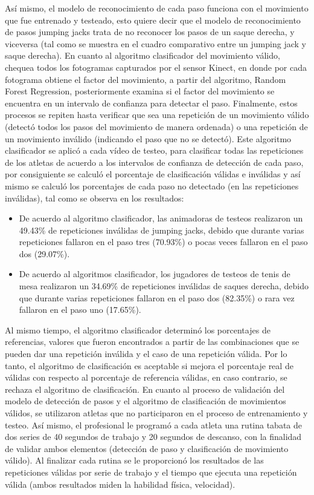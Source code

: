 \medbreak
As\'i mismo, el modelo de reconocimiento de cada paso funciona con el movimiento que fue entrenado y testeado, esto quiere decir que el modelo de reconocimiento de pasos jumping jacks trata de no reconocer los pasos de un saque derecha, y viceversa (tal como se muestra en el cuadro comparativo entre un jumping jack  y saque derecha).
\medbreak
En cuanto al algoritmo clasificador del movimiento v\'alido, chequea todos los fotogramas capturados por el sensor Kinect, en donde por cada fotograma obtiene el factor del movimiento, a partir del algoritmo, Random Forest Regression, posteriormente examina si el factor del movimiento se encuentra en un intervalo de confianza para detectar el paso. Finalmente, estos procesos se repiten hasta verificar que sea una repetici\'on de un movimiento v\'alido (detect\'o todos los pasos del movimiento de manera ordenada) o una repetici\'on de un movimiento inv\'alido (indicando el paso que no se detect\'o).
\medbreak
Este algoritmo clasificador se aplic\'o a cada v\'ideo de testeo, para clasificar todas las repeticiones de los atletas de acuerdo a los intervalos de confianza de detecci\'on de cada paso, por consiguiente se calcul\'o el porcentaje de clasificaci\'on v\'alidas e inv\'alidas y as\'i mismo se calcul\'o los porcentajes de cada paso no detectado (en las repeticiones inv\'alidas), tal como se observa en los resultados:
\begin{itemize}
\item	De acuerdo al algoritmo clasificador, las animadoras de testeos realizaron un 49.43\% de repeticiones inv\'alidas de jumping jacks, debido que durante varias repeticiones fallaron en el paso tres (70.93\%) o pocas veces fallaron en el paso dos (29.07\%).
\item De acuerdo al algoritmos clasificador, los jugadores de testeos de tenis de mesa realizaron un 34.69\% de repeticiones inv\'alidas de saques derecha, debido que durante varias repeticiones fallaron en el paso dos (82.35\%) o rara vez fallaron en el paso uno (17.65\%).
\end{itemize}
Al mismo tiempo, el algoritmo clasificador determin\'o los porcentajes de referencias, valores que fueron encontrados a partir de las combinaciones que se pueden dar una repetici\'on inv\'alida y el caso de una repetici\'on v\'alida. 
\medbreak
Por lo tanto, el algoritmo de clasificaci\'on es aceptable si mejora el porcentaje real de v\'alidas con respecto al porcentaje de referencia v\'alidas, en caso contrario, se rechaza el algoritmo de clasificaci\'on.
\medbreak
En cuanto al proceso de validaci\'on del modelo de detecci\'on de pasos y el algoritmo de clasificaci\'on de movimientos v\'alidos, se utilizaron atletas que no participaron en el proceso de entrenamiento y testeo. As\'i mismo, el profesional le program\'o a cada atleta una rutina tabata de dos series de 40 segundos de trabajo y 20 segundos de descanso, con la finalidad de validar ambos elementos (detecci\'on de paso y clasificaci\'on de movimiento v\'alido). Al finalizar cada rutina se le proporcion\'o los resultados de las repeticiones v\'alidas por serie de trabajo y el tiempo que ejecuta una repetici\'on v\'alida (ambos resultados miden la habilidad f\'isica, velocidad). 
